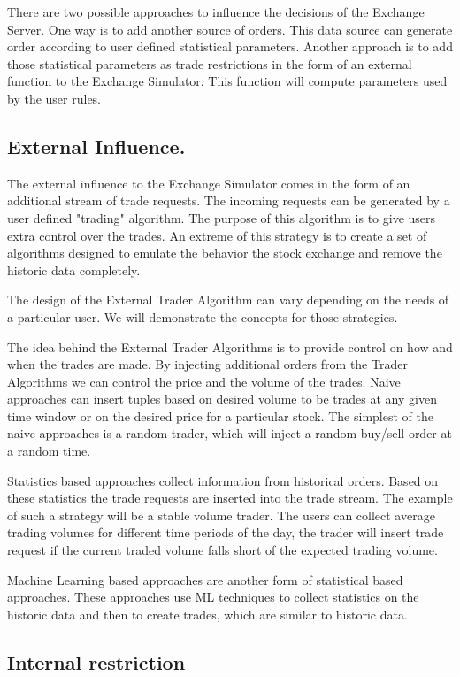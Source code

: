 \documentclass{article}
\begin{document}
There are two possible approaches to influence the decisions of the Exchange Server. One way is to add another source of orders. This data source can generate order according to user defined statistical parameters. Another approach is to add those statistical parameters as trade restrictions in the form of an external function to the Exchange Simulator. This function will compute parameters used by the user rules.

\subsection{External Influence.}

The external influence to the Exchange Simulator comes in the form of an additional stream of trade requests. The incoming requests can be generated by a user defined "trading" algorithm. The purpose of this algorithm is to give users extra control over the trades. An extreme of this strategy is to create a set of algorithms designed to emulate the behavior the stock exchange and remove the historic data completely. 

The design of the External Trader Algorithm can vary depending on the needs of a particular user. We will demonstrate the concepts for those strategies.

The idea behind the External Trader Algorithms is to provide control on how and when the trades are made. By injecting additional orders from the Trader Algorithms we can control the price and the volume of the trades. Naive approaches can insert tuples based on desired volume to be trades at any given time window or on the desired price for a particular stock. The simplest of the naive approaches is a random trader, which will inject a random buy/sell order at a random time.  

Statistics based approaches collect information from historical orders. Based on these statistics the trade requests are inserted into the trade stream. The example of such a strategy will be a stable volume trader. The users can collect average trading volumes for different time periods of the day, the trader will insert trade request if the current traded volume falls short of the expected trading volume.

Machine Learning based approaches are another form of statistical based approaches. These approaches use ML techniques to collect statistics on the historic data and then to create trades, which are similar to historic data. 

\subsection{Internal restriction}
\end{document}
